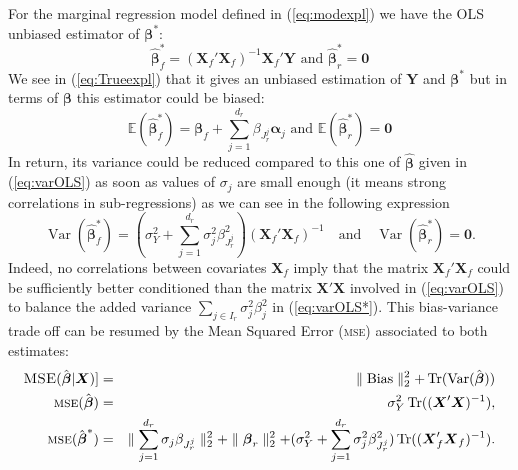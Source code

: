 \documentclass[12pt,a4paper]{report}
\begin{document}
For the marginal regression model defined in (\ref{eq:modexpl})
we have the \textsc{OLS} unbiased estimator of $\boldsymbol{\beta}^*$: 
		\begin{equation}
			\hat{\boldsymbol{\beta}}_{f}^* = (\boldsymbol{X}_{f}'\boldsymbol{X}_{f})^{-1}\boldsymbol{X}_{f}'\boldsymbol{Y}  \textrm{ and }\boldsymbol{\hat\beta}_{r}^* = \boldsymbol{0}
		\end{equation}
		We see in (\ref{eq:Trueexpl}) that it gives an unbiased estimation of $\boldsymbol{Y}$ and $\boldsymbol{\beta^*}$
		but in terms of $\boldsymbol{\beta}$ this estimator could be biased:
		\begin{equation}
			\mathbb{E}(\hat{\boldsymbol{\beta}}_{f}^*)=\boldsymbol{\beta}_{f}+\sum_{j =1}^{d_r}\beta_{J_r^j}\boldsymbol{\alpha}_j \textrm{ and }\mathbb{E}(\hat{\boldsymbol{\beta}}_{r}^*)=\boldsymbol{0}
		\end{equation}
		In return, its variance could be reduced compared to this one of $\hat{\boldsymbol{\beta}}$ given in (\ref{eq:varOLS}) as soon as values of $\sigma_j$ are small enough (it means strong correlations in sub-regressions) as we can see in the following expression
		\begin{equation}
			\operatorname{Var}(\hat{\boldsymbol{\beta}}_f^*)= (\sigma^2_Y+\sum_{j =1}^{d_r}\sigma^2_{j}\beta_{J_r^j}^2)(\boldsymbol{X}_f' \boldsymbol{X}_f)^{-1} \quad \textrm{and} \quad\operatorname{Var}(\hat{\boldsymbol{\beta}}_r^*)= \boldsymbol{0}. \label{eq:varOLS*}
		\end{equation}
Indeed, no correlations between covariates $\boldsymbol{X}_f$ imply that the matrix $\boldsymbol{X}_f' \boldsymbol{X}_f$ could be sufficiently better conditioned than the matrix $\boldsymbol{X}' \boldsymbol{X}$ involved in (\ref{eq:varOLS}) to balance the added variance $\sum_{j \in I_r}\sigma^2_{j}\beta_{j}^2$ in (\ref{eq:varOLS*}). This bias-variance trade off can be resumed by the Mean Squared Error (\textsc{mse}) associated to both estimates:
	\begin{eqnarray}
	\textsc{MSE}(\hat{\boldsymbol{\beta}}|\boldsymbol{X})]&=&\parallel \operatorname{Bias}\parallel_2^2+\operatorname{Tr}(\operatorname{Var}(\hat{\boldsymbol{\beta}})) \\
			\textsc{mse}(\hat{\boldsymbol{\beta}})&=& \sigma_Y^2 \operatorname{Tr}((\boldsymbol{X}'\boldsymbol{X})^{-1}),
			 \\
			\textsc{mse}(\hat{\boldsymbol{\beta}}^*)&=& \parallel\sum_{j =1}^{d_r}\sigma_{j}\beta_{J_r^j} \parallel_2^2 +\parallel \boldsymbol{\beta}_r\parallel^2_2 + (\sigma^2_Y+\sum_{j =1}^{d_r}\sigma^2_{j}\beta_{J_r^j}^2 ) \operatorname{Tr}((\boldsymbol{X}_f' \boldsymbol{X}_f)^{-1}).
	\end{eqnarray}	 
 				  
\end{document}
